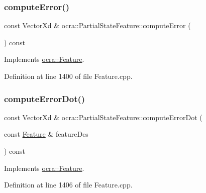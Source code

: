 \subsubsection{\texorpdfstring{compute\+Error()}{computeError()}\hspace{0.1cm}{\footnotesize\ttfamily [2/2]}}
{\footnotesize\ttfamily const Vector\+Xd \& ocra\+::\+Partial\+State\+Feature\+::compute\+Error (\begin{DoxyParamCaption}{ }\end{DoxyParamCaption}) const\hspace{0.3cm}{\ttfamily [virtual]}}



Implements \hyperlink{classocra_1_1Feature_a88f87b496aedc7bf9f13b19bb8f9c7fa}{ocra\+::\+Feature}.



Definition at line 1400 of file Feature.\+cpp.

\hypertarget{classocra_1_1PartialStateFeature_a5abaab0eb99ac60f0150c4137960ee14}{}\label{classocra_1_1PartialStateFeature_a5abaab0eb99ac60f0150c4137960ee14} 
\subsubsection{\texorpdfstring{compute\+Error\+Dot()}{computeErrorDot()}\hspace{0.1cm}{\footnotesize\ttfamily [1/2]}}
{\footnotesize\ttfamily const Vector\+Xd \& ocra\+::\+Partial\+State\+Feature\+::compute\+Error\+Dot (\begin{DoxyParamCaption}\item[{const \hyperlink{classocra_1_1Feature}{Feature} \&}]{feature\+Des }\end{DoxyParamCaption}) const\hspace{0.3cm}{\ttfamily [virtual]}}



Implements \hyperlink{classocra_1_1Feature_ac714181e1bb25f878349e299c4ba8c00}{ocra\+::\+Feature}.



Definition at line 1406 of file Feature.\+cpp.

\hypertarget{classocra_1_1PartialStateFeature_a946499ed311c24cb0cd9953b51b7d170}{}\label{classocra_1_1PartialStateFeature_a946499ed311c24cb0cd9953b51b7d170} 
